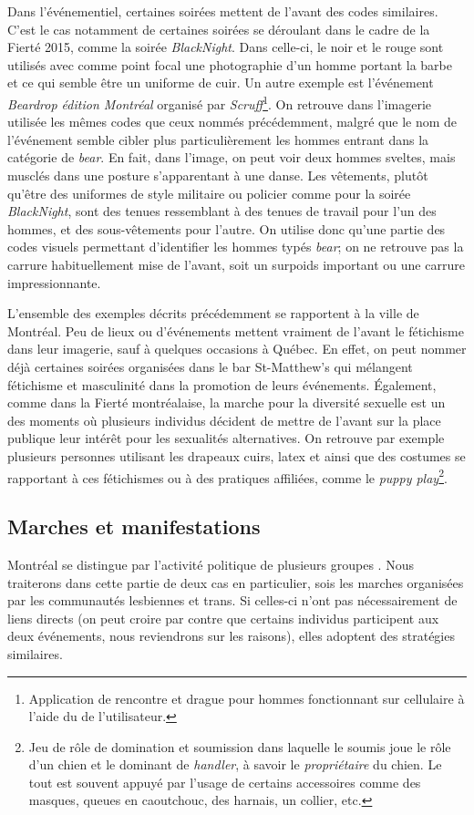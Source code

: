 Dans l'événementiel, certaines soirées mettent de l'avant des codes similaires.
C'est le cas notamment de certaines soirées se déroulant dans le cadre de la Fierté 2015, comme la soirée  \emph{BlackNight}.
Dans celle-ci, le noir et le rouge sont utilisés avec comme point focal une photographie d'un homme portant la barbe et ce qui semble être un uniforme de cuir.
Un autre exemple est l'événement \emph{Beardrop édition Montréal} organisé par \emph{Scruff}\footnote{Application de rencontre et drague pour hommes fonctionnant sur cellulaire à l'aide du \gps{} de l'utilisateur.}.
On retrouve dans l'imagerie utilisée les mêmes codes que ceux nommés précédemment, malgré que le nom de l'événement semble cibler plus particulièrement les hommes entrant dans la catégorie de \emph{bear}.
En fait, dans l'image, on peut voir deux hommes sveltes, mais musclés dans une posture s'apparentant à une danse.
Les vêtements, plutôt qu'être des uniformes de style militaire ou policier comme pour la soirée \emph{BlackNight}, sont des tenues ressemblant à des tenues de travail pour l'un des hommes, et des sous-vêtements pour l'autre.
On utilise donc qu'une partie des codes visuels permettant d'identifier les hommes typés \emph{bear}; on ne retrouve pas la carrure habituellement mise de l'avant, soit un surpoids important ou une carrure impressionnante.

L'ensemble des exemples décrits précédemment se rapportent à la ville de Montréal.
Peu de lieux ou d'événements mettent vraiment de l'avant le fétichisme dans leur imagerie, sauf à quelques occasions à Québec.
En effet, on peut nommer déjà certaines soirées organisées dans le bar St-Matthew's qui mélangent fétichisme et masculinité dans la promotion de leurs événements.
Également, comme dans la Fierté montréalaise, la marche pour la diversité sexuelle est un des moments où plusieurs individus décident de mettre de l'avant sur la place publique leur intérêt pour les sexualités alternatives.
On retrouve par exemple plusieurs personnes utilisant les drapeaux cuirs, latex et \bdsm{} ainsi que des costumes se rapportant à ces fétichismes ou à des pratiques affiliées, comme le \emph{puppy play}\footnote{Jeu de rôle de domination et soumission dans laquelle le soumis joue le rôle d'un chien  et le dominant de \emph{handler}, à savoir le \emph{propriétaire} du chien. Le tout est souvent appuyé par l'usage de certains accessoires comme des masques, queues en caoutchouc, des harnais, un collier, etc.}.

\subsection{Marches et manifestations}
\label{subsec:label}
 Montréal se distingue par l'activité politique de plusieurs groupes \lgbt{}.
Nous traiterons dans cette partie de deux cas en particulier, sois les marches organisées par les communautés lesbiennes et trans. Si celles-ci n'ont pas nécessairement de liens directs (on peut croire par contre que certains individus participent aux deux événements, nous reviendrons sur les raisons), elles adoptent des stratégies similaires.


